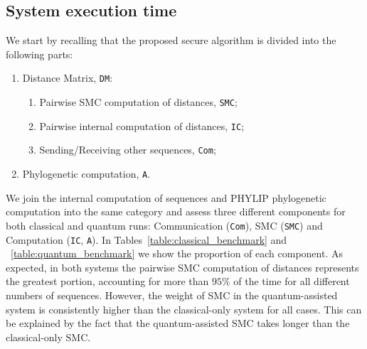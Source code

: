 
\subsection{System execution time}

We start by recalling that the proposed secure algorithm is divided into the following parts:

\begin{enumerate}
    \item Distance Matrix, \texttt{DM}:
    \begin{enumerate}
        \item Pairwise SMC computation of distances, \texttt{SMC};
        \item Pairwise internal computation of distances, \texttt{IC};
        \item Sending/Receiving other sequences, \texttt{Com};
    \end{enumerate}
    \item Phylogenetic computation, \texttt{A}.
\end{enumerate}

We join the internal computation of sequences and PHYLIP phylogenetic computation into the same category and assess three different components for both classical and quantum runs: Communication (\texttt{Com}), SMC (\texttt{SMC}) and Computation (\texttt{IC}, \texttt{A}). In Tables~\ref{table:classical_benchmark} and ~\ref{table:quantum_benchmark} we show the proportion of each component. As expected, in both systems the pairwise SMC computation of distances represents the greatest portion, accounting for more than $95\%$ of the time for all different numbers of sequences. However, the weight of SMC in the quantum-assisted system is consistently higher than the classical-only system for all cases. This can be explained by the fact that the quantum-assisted SMC takes longer than the classical-only SMC.


